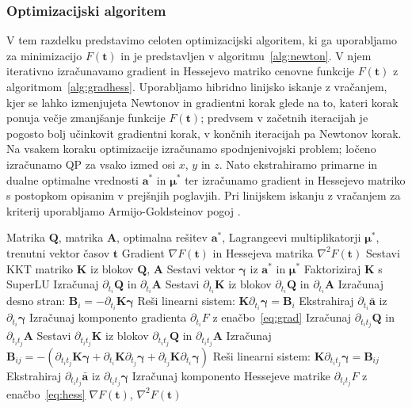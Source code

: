 \documentclass[isrm2, tisk]{fmfdelo}
\newcommand{\aimplicit}{\bar{\mathbf{a}}}
\newcommand{\yimplicit}{\mathbf{\gamma}}
\newcommand{\qmat}{\mathbf{Q}}
\newcommand{\amat}{\mathbf{A}}
\newcommand{\kmat}{\mathbf{K}}
\newcommand{\avec}{\mathbf{a}}
\newcommand{\tvec}{\mathbf{t}}
\newcommand{\muvec}{\boldsymbol{\mu}}
\begin{document}
\subsubsection{Optimizacijski algoritem}

V tem razdelku predstavimo celoten optimizacijski algoritem, ki ga uporabljamo za minimizacijo $F(\tvec)$ in je predstavljen v algoritmu~\ref{alg:newton}. V njem iterativno izračunavamo gradient in Hessejevo matriko cenovne funkcije $F(\tvec)$ z algoritmom~\ref{alg:gradhess}. Uporabljamo hibridno linijsko iskanje z vračanjem, kjer se lahko izmenjujeta Newtonov in gradientni korak glede na to, kateri korak ponuja večje zmanjšanje funkcije $F(\tvec)$; predvsem v začetnih iteracijah je pogosto bolj učinkovit gradientni korak, v končnih iteracijah pa Newtonov korak. Na vsakem koraku optimizacije izračunamo spodnjenivojski problem; ločeno izračunamo \ac{QP} za vsako izmed osi $x$, $y$ in $z$. Nato ekstrahiramo primarne in dualne optimalne vrednosti $\avec^*$ in $\muvec^*$ ter izračunamo gradient in Hessejevo matriko s postopkom opisanim v prejšnjih poglavjih. Pri linijskem iskanju z vračanjem za kriterij uporabljamo Armijo-Goldsteinov pogoj \cite{nocedal2006numerical}.

\begin{algorithm}[H]
\caption{Izračun gradienta in Hessejeve matrike (gradHess)}
\label{alg:gradhess}
\begin{algorithmic}[1]
\REQUIRE Matrika $\qmat$, matrika $\amat$, optimalna rešitev $\avec^*$, Lagrangeevi multiplikatorji $\muvec^*$, trenutni vektor časov $\tvec$
\ENSURE Gradient $\nabla F(\tvec)$ in Hessejeva matrika $\nabla^2 F(\tvec)$
\STATE Sestavi KKT matriko $\kmat$ iz blokov $\qmat$, $\amat$
\STATE Sestavi vektor $\yimplicit$ iz $\avec^*$ in $\muvec^*$
\STATE Faktoriziraj $\kmat$ s SuperLU
    \STATE Izračunaj $\partial_{t_i}\qmat$ in $\partial_{t_i}\amat$
    \STATE Sestavi $\partial_{t_i}\kmat$ iz blokov $\partial_{t_i}\qmat$ in $\partial_{t_i}\amat$
    \STATE Izračunaj desno stran: $\mathbf{B}_i = -\partial_{t_i}\kmat \yimplicit$
    \STATE Reši linearni sistem: $\kmat \partial_{t_i}\yimplicit = \mathbf{B}_i$
    \STATE Ekstrahiraj $\partial_{t_i}\aimplicit$ iz $\partial_{t_i}\yimplicit$
    \STATE Izračunaj komponento gradienta $\partial_{t_i} F$ z enačbo~\eqref{eq:grad}
\ENDFOR
{}
        \STATE Izračunaj $\partial_{t_it_j}\qmat$ in $\partial_{t_it_j}\amat$
        \STATE Sestavi $\partial_{t_it_j}\kmat$ iz blokov $\partial_{t_it_j}\qmat$ in $\partial_{t_it_j}\amat$
        \STATE Izračunaj $\mathbf{B}_{ij} = -(\partial_{t_it_j}\kmat \yimplicit + \partial_{t_i}\kmat \partial_{t_j}\yimplicit + \partial_{t_j}\kmat \partial_{t_i}\yimplicit)$
        \STATE Reši linearni sistem: $\kmat \partial_{t_it_j}\yimplicit = \mathbf{B}_{ij}$
        \STATE Ekstrahiraj $\partial_{t_it_j}\aimplicit$ iz $\partial_{t_it_j}\yimplicit$
        \STATE Izračunaj komponento Hessejeve matrike $\partial_{t_it_j} F$ z enačbo~\eqref{eq:hess}
    \ENDFOR
\ENDFOR
\RETURN $\nabla F(\tvec)$, $\nabla^2 F(\tvec)$
\end{algorithmic}
\end{algorithm}
\end{document}
